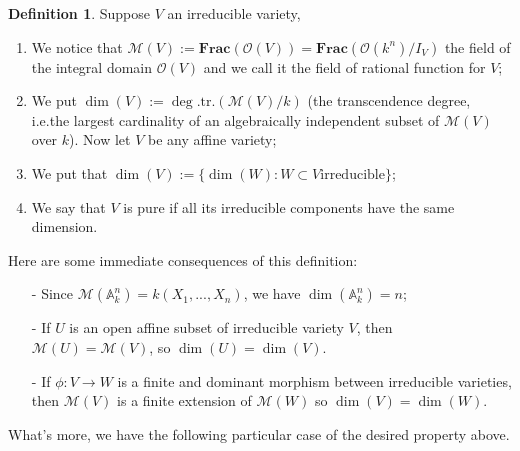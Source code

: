 \documentclass[12pt,a4paper,english]{article}
\theoremstyle{plain}
\theoremstyle{definition}
\newtheorem{defi}{Definition}
\theoremstyle{remark}
\newcommand{\Frac}{\mathbf{Frac}}
\newcommand{\tr}{\mathrm{tr}}
\begin{document}
\begin{defi}
Suppose $V$ an irreducible variety,
\begin{enumerate}
    \item We notice that $\mathcal{M}(V):=\Frac(\mathcal{O}(V))=\Frac(\mathcal{O}(k^{n})/I_{V})$ the field of the integral domain $\mathcal{O}(V)$ and we call it the field of rational function for $V$;
    \item We put $\dim(V):=\deg.\tr.(\mathcal{M}(V)/ k)$ (the transcendence degree, i.e.the largest cardinality of an algebraically independent subset of $\mathcal{M}(V)$ over $k$). Now let $V$ be any affine variety;
    \item We put that $\dim(V):=\{\dim(W):W\subset V \text{irreducible}\}$;
    \item We say that $V$ is pure if all its irreducible components have the same dimension.
\end{enumerate}
Here are some immediate consequences of this definition:
\begin{enumerate}
    \item[-] Since $\mathcal{M}(\mathbb{A}^{n}_{k})=k(X_{1},...,X_{n})$, we have $\dim(\mathbb{A}^{n}_{k})=n$;
    \item[-] If $U$ is an open affine subset of irreducible variety $V$, then $\mathcal{M}(U)=\mathcal{M}(V)$, so $\dim(U)=\dim(V)$.
    \item[-] If $\phi:V\rightarrow W$ is a finite and dominant morphism between irreducible varieties, then $\mathcal{M}(V)$ is a finite extension of $\mathcal{M}(W)$ so $\dim(V)=\dim(W)$.
\end{enumerate}
\end{defi}
What's more, we have the following particular case of the desired property above.
\end{document}
